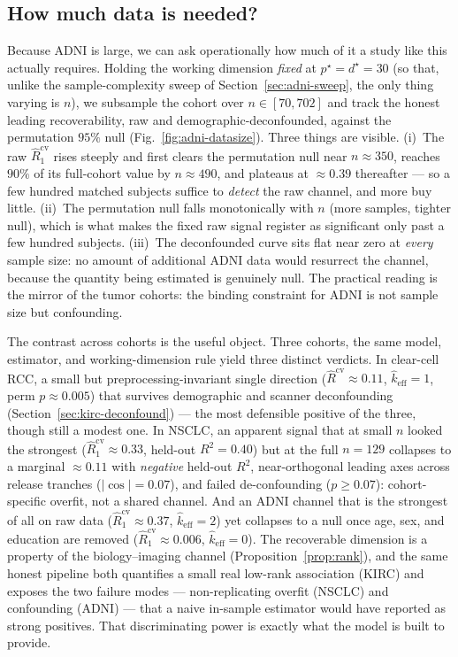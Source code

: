 \documentclass{article}
\begin{document}
\subsection{How much data is needed?}
\label{sec:adni-datasize}
Because ADNI is large, we can ask operationally how much of it a study like this
actually requires. Holding the working dimension \emph{fixed} at
$p^\star = d^\star = 30$ (so that, unlike the sample-complexity sweep of
Section~\ref{sec:adni-sweep}, the only thing varying is $n$), we subsample the
cohort over $n \in [70, 702]$ and track the honest leading recoverability, raw
and demographic-deconfounded, against the permutation $95\%$ null
(Fig.~\ref{fig:adni-datasize}). Three things are visible. (i)~The raw
$\hat R_1^{\mathrm{cv}}$ rises steeply and first clears the permutation null near
$n \approx 350$, reaches $90\%$ of its full-cohort value by $n \approx 490$, and
plateaus at $\approx 0.39$ thereafter --- so a few hundred matched subjects
suffice to \emph{detect} the raw channel, and more buy little. (ii)~The permutation null
falls monotonically with $n$ (more samples, tighter null), which is what makes
the fixed raw signal register as significant only past a few hundred subjects.
(iii)~The deconfounded curve sits flat near zero at \emph{every} sample size:
no amount of additional ADNI data would resurrect the channel, because the
quantity being estimated is genuinely null. The practical reading is the
mirror of the tumor cohorts: the binding constraint for ADNI is not sample
size but confounding.


The contrast across cohorts is the useful object. Three cohorts, the same
model, estimator, and working-dimension rule yield three distinct verdicts.
In clear-cell RCC, a small but preprocessing-invariant single direction
($\hat R^{\mathrm{cv}}\approx 0.11$, $\hat k_{\mathrm{eff}}=1$, perm
$p\approx 0.005$) that survives demographic and scanner deconfounding
(Section~\ref{sec:kirc-deconfound}) --- the most defensible positive of the
three, though still a modest one. In NSCLC, an
apparent signal that at small $n$ looked the strongest
($\hat R_1^{\mathrm{cv}}\approx 0.33$, held-out $R^2 = 0.40$) but at the full
$n = 129$ collapses to a marginal $\approx 0.11$ with \emph{negative} held-out
$R^2$, near-orthogonal leading axes across release tranches ($|\cos| = 0.07$),
and failed de-confounding ($p \ge 0.07$): cohort-specific overfit, not a shared
channel. And an ADNI channel that is the strongest of all on raw data
($\hat R_1^{\mathrm{cv}}\approx 0.37$, $\hat k_{\mathrm{eff}}=2$) yet collapses
to a null once age, sex, and education are removed
($\hat R_1^{\mathrm{cv}}\approx 0.006$, $\hat k_{\mathrm{eff}}=0$). The
recoverable dimension is a property of the biology--imaging channel
(Proposition~\ref{prop:rank}), and the same honest pipeline both quantifies a
small real low-rank association (KIRC) and exposes the two failure modes ---
non-replicating overfit (NSCLC) and confounding (ADNI) --- that a naive
in-sample estimator would have reported as strong positives. That discriminating
power is exactly what the model is built to provide.
\end{document}
